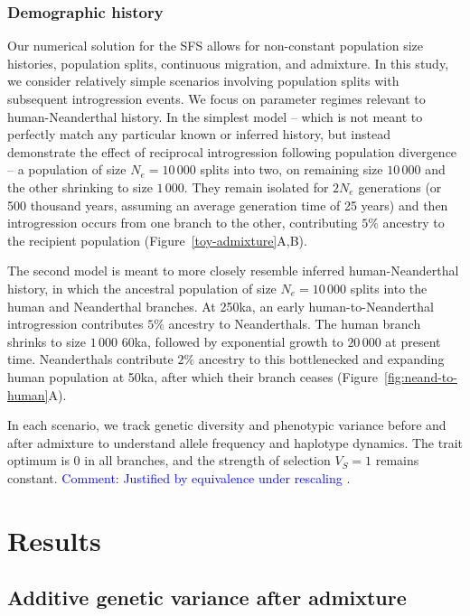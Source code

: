 \documentclass{article}
\newcommand{\aprcomment}[1]{{\textcolor{blue}{Comment: #1}}}
\begin{document}
\subsubsection*{Demographic history}

Our numerical solution for the SFS allows for non-constant population size
histories, population splits, continuous migration, and admixture. In this
study, we consider relatively simple scenarios involving population splits with
subsequent introgression events. We focus on parameter regimes relevant to
human-Neanderthal history. In the simplest model -- which is not meant to
perfectly match any particular known or inferred history, but instead
demonstrate the effect of reciprocal introgression following population
divergence -- a population of size $N_e=10\,000$ splits into two, on remaining
size $10\,000$ and the other shrinking to size $1\,000$. They remain isolated
for $2N_e$ generations (or 500 thousand years, assuming an average generation
time of 25 years) and then introgression occurs from one branch to the other,
contributing $5\%$ ancestry to the recipient population
(Figure~\ref{toy-admixture}A,B).

The second model is meant to more closely resemble inferred human-Neanderthal
history, in which the ancestral population of size $N_e=10\,000$ splits into
the human and Neanderthal branches. At 250ka, an early human-to-Neanderthal
introgression contributes $5\%$ ancestry to Neanderthals. The human branch
shrinks to size $1\,000$ 60ka, followed by exponential growth to $20\,000$ at
present time. Neanderthals contribute $2\%$ ancestry to this bottlenecked and
expanding human population at 50ka, after which their branch ceases
(Figure~\ref{fig:neand-to-human}A).

In each scenario, we track genetic diversity and phenotypic variance before and
after admixture to understand allele frequency and haplotype dynamics. The
trait optimum is $0$ in all branches, and the strength of selection $V_S=1$
remains constant. \aprcomment{Justified by equivalence under rescaling
\citep{simons2018population}.}

\section*{Results}

\subsection*{Additive genetic variance after admixture}
\end{document}
